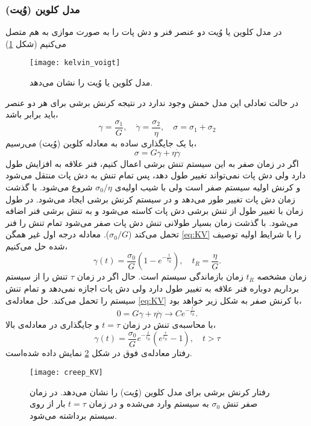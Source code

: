 \subsubsection{مدل کلوین (وُیت)}
در مدل کلوین یا وُیت دو عنصر فنر و دش پات را به صورت موازی به هم متصل می‌کنیم (شکل \ref{fig:KV})
\begin{figure}[htbp]
\begin{center}
\texttt{[image: kelvin\_voigt]}
\caption{
مدل کلوین یا وُیت را نشان می‌دهد.
}
\label{fig:KV}
\end{center}
\end{figure}
در حالت تعادلی این مدل خمش وجود ندارد در نتیجه کرنش برشی برای هر دو عنصر باید برابر باشد،
\begin{equation}
\gamma=\frac{\sigma_1}{G}, \quad \dot\gamma=\frac{\sigma_2}{\eta}, \quad \sigma=\sigma_1+\sigma_2
\end{equation}
با یک جایگذاری ساده به معادله کلوین (وُیت) می‌رسیم،
\begin{equation}
\sigma=G\gamma+\eta\dot\gamma
\label{eq:KV}
\end{equation}
اگر در زمان صفر به این سیستم تنش برشی اعمال کنیم، فنر علاقه به افزایش طول دارد ولی دش پات نمی‌تواند تغییر طول دهد، پس تمام تنش به دش پات منتقل می‌شود و کرنش اولیه سیستم صفر است ولی با شیب اولیه‌ی $\sigma_0/\eta$ شروع می‌شود. با گذشت زمان دش پات تغییر طور می‌دهد و در سیستم کرنش برشی ایجاد می‌شود. در طول زمان با تغییر طول از  تنش برشی دش پات کاسته می‌شود و به تنش برشی فنر اضافه می‌شود. با گذشت زمان بسیار طولانی تنش دش پات صفر می‌شود تمام تنش را فنر تحمل می‌کند ($\sigma_0/G$).
معادله درجه اول غیر همگن \ref{eq:KV} را با شرایط اولیه توصیف شده حل می‌کنیم،
\begin{equation}
\gamma(t)=\frac{\sigma_0}{G}\left(1-e^{-\frac{t}{t_R}}\right), \quad t_R=\frac{\eta}{G}.
\end{equation}
زمان مشخصه $t_R$ زمان بازماندگی سیستم است. حال اگر در زمان $\tau$ تنش را از سیستم برداریم دوباره فنر علاقه به تغییر طول دارد ولی دش پات اجازه نمی‌دهد و تمام تنش سیستم را تحمل می‌کند. حل معادله‌ی \ref{eq:KV} با کرنش صفر به شکل زیر خواهد بود،
\begin{equation}
0=G\gamma+\eta\dot\gamma \rightarrow Ce^{-\frac{t}{t_R}}.
\end{equation}
با محاسبه‌ی تنش در زمان $t=\tau$ و جایگذاری در معادله‌ی بالا،
\begin{equation}
\gamma(t)=\frac{\sigma_0}{G}e^{-\frac{t}{t_R}}\left(e^{\frac{\tau}{t_R}}-1\right), \quad t>\tau
\end{equation}
رفتار معادله‌ی فوق در شکل \ref{fig:creep_KV} نمایش داده شده‌است.
\begin{figure}[htbp]
\begin{center}
\texttt{[image: creep\_KV]}
\caption{
رفتار کرنش برشی برای مدل کلوین (وُیت) را نشان می‌دهد. در زمان صفر تنش $\sigma_0$ به سیستم وارد می‌شده و در زمان $t=\tau$ بار از روی سیستم برداشته می‌شود.
}
\label{fig:creep_KV}
\end{center}
\end{figure}
